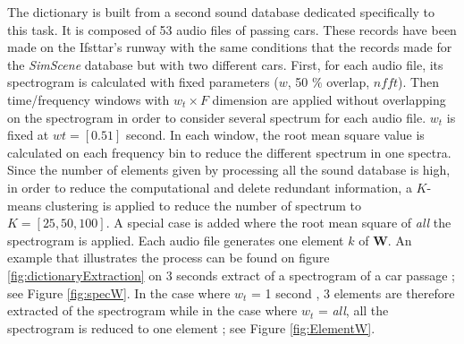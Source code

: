 \documentclass[twocolumn,a4paper,10pt]{article}
\begin{document}
The dictionary is built from a second sound database dedicated specifically to this task. It is composed of 53 audio files of passing cars. These records have been made on the Ifsttar's runway with the same conditions that the records made for the \textit{SimScene} database but with two different cars. First, for each audio file, its spectrogram is calculated with fixed parameters ($w$, 50 $\%$ overlap, $nfft$). Then time/frequency windows with $w_t \times F$ dimension are applied without overlapping on the spectrogram in order to consider several spectrum for each audio file. $w_t$ is fixed at $wt = [0.5 1]$ second. In each window, the root mean square value is calculated on each frequency bin to reduce the different spectrum in one spectra. Since the number of elements given by processing all the sound database is high, in order to reduce the computational and delete redundant information, a $K$-means clustering is applied to reduce the number of spectrum to $K = \left[ 25, 50, 100 \right]$. A special case is added where the root mean square of \textit{all} the spectrogram is applied. Each audio file generates one element $k$ of $\mathbf{W}$. An example that illustrates the process can be found on figure \ref{fig:dictionaryExtraction} on 3 seconds extract of a spectrogram of a car passage ; see Figure \ref{fig:specW}. In the case where $w_t$ = 1 second , 3 elements are therefore extracted of the spectrogram while in the case where $w_t$ = \textit{all}, all the spectrogram is reduced to one element ; see Figure \ref{fig:ElementW}.
\end{document}
